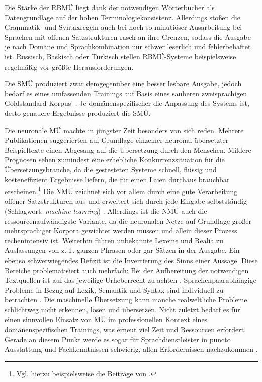 Die Stärke der RBMÜ liegt dank der notwendigen Wörterbücher als Datengrundlage auf der hohen Terminologiekonsistenz. Allerdings stoßen die Gram\-ma\-tik- und Syntaxregeln auch bei noch so minutiöser Ausarbeitung bei Sprachen mit offenen Satzstrukturen rasch an ihre Grenzen, sodass die Ausgabe je nach Domäne und Sprachkombination nur schwer leserlich und fehlerbehaftet ist. Russisch, Baskisch oder Türkisch stellen RBMÜ-Systeme beispielsweise regelmäßig vor größte Herausforderungen.

Die SMÜ produziert zwar demgegenüber eine besser lesbare Ausgabe, jedoch bedarf es eines umfassenden Trainings auf Basis eines sauberen zweisprachigen Goldstandard-Korpus' \citep[44]{bowker_machine_2019}. Je domänenspezifischer die Anpassung des Systems ist, desto genauere Ergebnisse produziert die SMÜ. 

Die neuronale MÜ machte in jüngster Zeit besonders von sich reden. Mehrere Publikationen suggerierten auf Grundlage einzelner neuronal übersetzter Beispieltexte einen Abgesang auf die Übersetzung durch den Menschen. Mildere Prognosen sehen zumindest eine erhebliche Konkurrenzsituation für die Übersetzungsbranche, da die gestesteten Systeme schnell, flüssig und kosteneffizient Ergebnisse liefern, die für einen Laien durchaus brauchbar erscheinen.\footnote{Vgl. hierzu beispielsweise die Beiträge von \citet{holzki_digitale_2020, himmelein_smarte_2019}.} Die NMÜ zeichnet sich vor allem durch eine gute Verarbeitung offener Satzstrukturen aus und erweitert sich durch jede Eingabe selbstständig (Schlagwort: \emph{machine learning}) \citep[45]{bowker_machine_2019}. Allerdings ist die NMÜ auch die ressourcenaufwändigste Variante, da die neuronalen Netze auf Grundlage großer mehrsprachiger Korpora gewichtet werden müssen und allein dieser Prozess rechenintensiv ist. Weiterhin führen unbekannte Lexeme und Realia zu Auslassungen von z.\,T. ganzen Phrasen oder gar Sätzen in der Ausgabe. Ein ebenso schwerwiegendes Defizit ist die Invertierung des Sinns einer Aussage. Diese Bereiche problematisiert auch \citeauthor{koehn_neural_2020} mehrfach: Bei der Aufbereitung der notwendigen Textquellen ist auf das jeweilige Urheberrecht zu achten \citep[7]{koehn_neural_2020}. Sprachenpaarabhängige Probleme in Bezug auf Lexik, Semantik und Syntax sind individuell zu betrachten \citep[9]{koehn_neural_2020}. Die maschinelle Übersetzung kann manche realweltliche Probleme schlichtweg nicht erkennen, lösen und übersetzen. Nicht zuletzt bedarf es für einen sinnvollen Einsatz von MÜ im professionellen Kontext eines domänenspezifischen Trainings, was erneut viel Zeit und Ressourcen erfordert. Gerade an diesem Punkt werde es sogar für Sprachdienstleister in puncto Ausstattung und Fachkenntnissen schwierig, allen Erfordernissen nachzukommen \citep[22]{koehn_neural_2020}.


